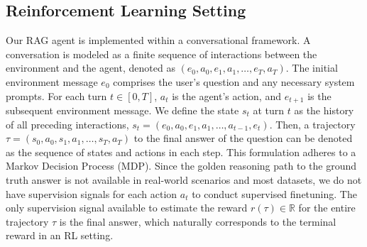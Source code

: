 \subsection{Reinforcement Learning Setting}
Our RAG agent is implemented within a conversational framework.
A conversation is modeled as a finite sequence of interactions between the environment and the agent, denoted as $(e_0, a_0, e_1, a_1, \dots, e_T, a_T)$.
The initial environment message $e_0$ comprises the user's question and any necessary system prompts.
For each turn $t \in [0, T]$, $a_t$ is the agent's action, and $e_{t+1}$ is the subsequent environment message.
We define the state $s_t$ at turn $t$ as the history of all preceding interactions, $s_t = (e_0, a_0, e_1, a_1, \dots, a_{t-1}, e_t)$.
Then, a trajectory $\tau = (s_0, a_0, s_1, a_1, \dots, s_T, a_T)$ to the final answer of the question can be denoted as the sequence of states and actions in each step. 
This formulation adheres to a Markov Decision Process (MDP).
Since the golden reasoning path to the ground truth answer is not available in real-world scenarios and most datasets,
 we do not have supervision signals for each action $a_t$ to conduct supervised finetuning.
The only supervision signal available to estimate the reward $r(\tau) \in \mathbb{R}$ for the entire trajectory $\tau$ is the final answer, which naturally corresponds to the terminal reward in an RL setting.


